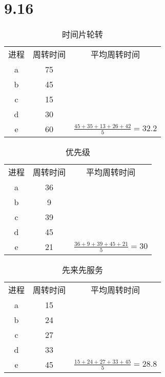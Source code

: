 \documentclass[UTF8]{ctexart}
\begin{document}
    \section*{9.16}
    
    \begin{table}[htb]
    \caption{时间片轮转}
        \begin{center}
            \begin{tabular}{ccc}
                \hline
                进程&周转时间&平均周转时间\\
                a&75\\
                b&45\\
                c&15\\
                d&30\\
                e&60&$\frac{45+35+13+26+42}{5} = 32.2$\\
                \hline
            \end{tabular}
        \end{center}
    \end{table}
    
    \begin{table}[htb]
    \caption{优先级}
        \begin{center}
            \begin{tabular}{ccc}
                \hline
                进程&周转时间&平均周转时间\\
                a&36\\
                b&9\\
                c&39\\
                d&45\\
                e&21&$\frac{36+9+39+45+21}{5} = 30$\\
                \hline
            \end{tabular}
        \end{center}
    \end{table}
    
    \begin{table}[htb]
        \begin{center}
        \caption{先来先服务}
            \begin{tabular}{ccc}
                \hline
                进程&周转时间&平均周转时间\\
                a&15\\
                b&24\\
                c&27\\
                d&33\\
                e&45&$\frac{15+24+27+33+45}{5} = 28.8$\\
                \hline
            \end{tabular}
        \end{center}
    \end{table}
    
\end{document}
